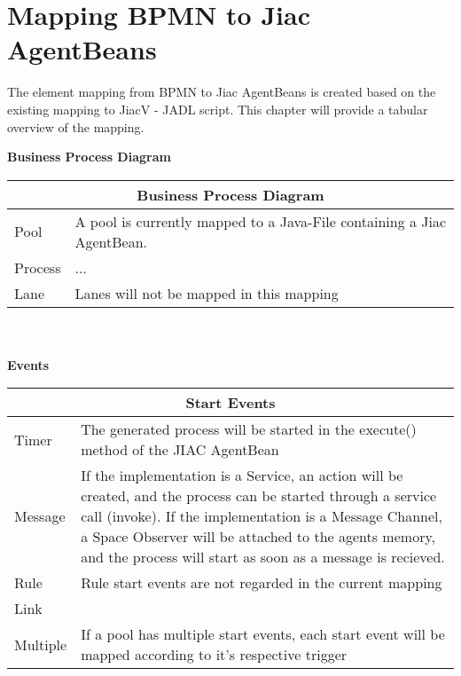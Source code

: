\chapter{Mapping BPMN to Jiac AgentBeans}

The element mapping from BPMN to Jiac AgentBeans is created based on the existing mapping to JiacV - JADL script. This chapter will provide a tabular overview of the mapping. 

\textbf{Business Process Diagram}

\begin{table*}[hp]
	\centering
		\begin{tabular}{|l|l|}\hline\hline
			\multicolumn{2}{|c|}{\textbf{Business Process Diagram}} \\\hline\hline
			 Pool & A pool is currently mapped to a Java-File containing a Jiac AgentBean.\\\hline
			 Process & ...\\\hline
			 Lane & Lanes will not be mapped in this mapping\\\hline \hline
		\end{tabular}
\end{table*}\\\\

\textbf{Events}
\begin{table*}[hp]
	\centering
		\begin{tabular}{|l|l|}\hline\hline
			\multicolumn{2}{|c|}{\textbf{Start Events}} \\\hline\hline
			 Timer & The generated process will be started in the execute() method of the JIAC AgentBean\\\hline
			 Message & If the implementation is a Service, an action will be created, and the process can be started through a service call (invoke). If the implementation is a Message Channel, a Space Observer will be attached to the agents memory, and the process will start as soon as a message is recieved.\\\hline
			 Rule & Rule start events are not regarded in the current mapping\\\hline
			 Link & \\\hline
			 Multiple & If a pool has multiple start events, each start event will be mapped according to it's respective trigger\\\hline\hline
		\end{tabular}
\end{table*}\\\\